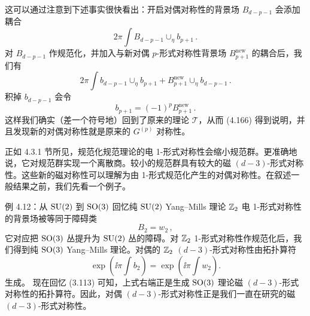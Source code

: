 这可以通过注意到下述事实很快看出：开启对偶对称性的背景场 $B_{d-p-1}$ 会添加耦合
\begin{equation}
2\pi\int B_{d-p-1}\cup_\eta b_{p+1}\,.
\tag{4.167}
\end{equation}
对 $B_{d-p-1}$ 作规范化，并加入与新对偶 $p$-形式对称性背景场 $B^{\text{new}}_{p+1}$ 的耦合后，我们有
\begin{equation}
2\pi\int b_{d-p-1}\cup_\eta b_{p+1}+B^{\text{new}}_{p+1}\cup_\eta b_{d-p-1}\,.
\tag{4.168}
\end{equation}
积掉 $b_{d-p-1}$ 会令
\begin{equation}
b_{p+1}=(-1)^p B^{\text{new}}_{p+1}\,.
\tag{4.169}
\end{equation}
这样我们确实（差一个符号地）回到了原来的理论 $\mathcal{T}$，从而 (4.166) 得到说明，并且发现新的对偶对称性就是原来的 $G^{(p)}$ 对称性。


正如 4.3.1 节所见，规范化规范理论的电 1-形式对称性会缩小规范群。更准确地说，它对规范群实现一个离散商。较小的规范群具有较大的磁 $(d-3)$-形式对称性。这些新的磁对称性可以理解为由 1-形式规范化产生的对偶对称性。在叙述一般结果之前，我们先看一个例子。

\begin{examplebox}{例 4.12：从 $\mathrm{SU}(2)$ 到 $\mathrm{SO}(3)$}
回忆纯 $\mathrm{SU}(2)$ Yang--Mills 理论 $\mathbb{Z}_2$ 电 1-形式对称性的背景场被等同于障碍类
\begin{equation}
B_2=w_2\,,
\tag{4.170}
\end{equation}
它对应把 $\mathrm{SO}(3)$ 丛提升为 $\mathrm{SU}(2)$ 丛的障碍。对 $\mathbb{Z}_2$ 1-形式对称性作规范化后，我们得到纯 $\mathrm{SO}(3)$ Yang--Mills 理论。对偶的 $\mathbb{Z}_2$ $(d-3)$-形式对称性由拓扑算符
\begin{equation}
\exp\left(\ii\pi\int b_2\right)=\exp\left(\ii\pi\int w_2\right).
\tag{4.171}
\end{equation}
生成。
现在回忆 (3.113) 可知，上式右端正是生成 $\mathrm{SO}(3)$ 理论磁 $(d-3)$-形式对称性的拓扑算符。因此，对偶 $(d-3)$-形式对称性正是我们一直在研究的磁 $(d-3)$-形式对称性。
\end{examplebox}


